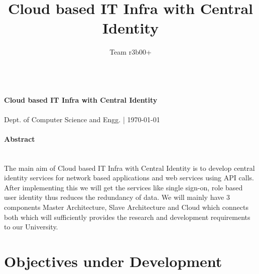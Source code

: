 \documentclass[]{article}
\begin{document}
\begin{center}
\Large
\textbf{ \\ Cloud based IT Infra with Central Identity \\}
%
\normalsize
\textsf{ \\ Dept. of Computer Science and Engg. | \today  \\ }
%
\end{center}

\title{Cloud based IT Infra with Central Identity}
\author{Team r3b00+ }



\paragraph{Abstract \\}
\hspace{1.5cm} \\ \hspace{1.5cm} The main aim of Cloud based IT Infra with Central Identity is to develop central identity services for network based applications and web services using API calls. After implementing this we will get the services like single sign-on, role based user identity thus reduces the redundancy of data. We will mainly have 3 components Master Architecture, Slave Architecture and Cloud which connects both which will sufficiently provides the research and development requirements to our University. 





\section*{Objectives under Development}
\end{document}
